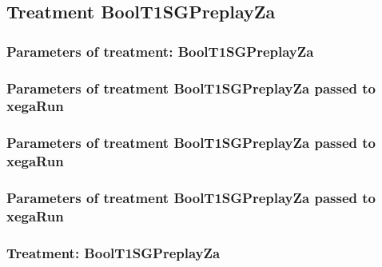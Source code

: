 \documentclass[18pt,c]{beamer}
\makeatletter
\def\beamer@writeslidentry@miniframesoff{%
  \expandafter\beamer@ifempty\expandafter{\beamer@framestartpage}{}%
  {%
   \clearpage\beamer@notesactions%
  }
}
\newcommand*{\miniframesoff}{\let\beamer@writeslidentry=\beamer@writeslidentry@miniframesoff}
\makeatother
\begin{document}
\miniframesoff
\subsection{Treatment BoolT1SGPreplayZa}

 \begin{frame}
 \fontsize{8pt}{9pt}\selectfont
 \frametitle{  Parameters of treatment: BoolT1SGPreplayZa 
 }

 \label{ExpCtParmTable008.tex}  
 \end{frame}


 \begin{frame}
 \fontsize{8pt}{9pt}\selectfont
 \frametitle{  Parameters of treatment BoolT1SGPreplayZa passed to xegaRun
 }

 \label{ExpCtParmTable009.tex}  
 \end{frame}


 \begin{frame}
 \fontsize{8pt}{9pt}\selectfont
 \frametitle{  Parameters of treatment BoolT1SGPreplayZa passed to xegaRun
 }

 \label{ExpCtParmTable010.tex}  
 \end{frame}


 \begin{frame}
 \fontsize{8pt}{9pt}\selectfont
 \frametitle{  Parameters of treatment BoolT1SGPreplayZa passed to xegaRun
 }

 \label{ExpCtParmTable011.tex}  
 \end{frame}

 \begin{frame}
 \fontsize{8pt}{9pt}\selectfont
 \frametitle{ Treatment: BoolT1SGPreplayZa }

 \label{ExpCStatsTable009.tex}  
 \end{frame}
\end{document}
